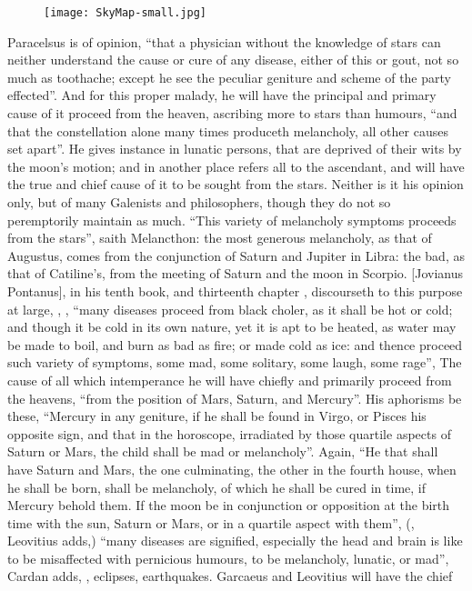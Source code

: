 \begin{figure}[p]
  \begingroup
  \centering
  \texttt{[image: SkyMap-small.jpg]}
  \label{fig:skymap}
\end{figure}

Paracelsus is of opinion, \enquote{that a physician without the
knowledge of stars can neither understand the cause or cure of any disease,
either of this or gout, not so much as toothache; except he see the peculiar
geniture and scheme of the party effected}. And for this proper malady, he will
have the principal and primary cause of it proceed from the heaven, ascribing
more to stars than humours, \enquote{and that the constellation
alone many times produceth melancholy, all other causes set apart}. He gives
instance in lunatic persons, that are deprived of their wits by the moon's
motion; and in another place refers all to the ascendant, and will have the
true and chief cause of it to be sought from the stars. Neither is it his
opinion only, but of many Galenists and philosophers, though they do not so
peremptorily maintain as much. \enquote{This variety of melancholy symptoms proceeds
from the stars}, saith Melancthon: the most generous
melancholy, as that of Augustus, comes from the conjunction of Saturn and
Jupiter in Libra: the bad, as that of Catiline's, from the meeting of Saturn
and the moon in Scorpio. [Jovianus Pontanus], in his tenth book, and thirteenth
chapter , discourseth to this purpose at large, , \etc{}, \enquote{many diseases
proceed from black choler, as it shall be hot or cold; and though it be cold in
its own nature, yet it is apt to be heated, as water may be made to boil, and
burn as bad as fire; or made cold as ice: and thence proceed such variety of
symptoms, some mad, some solitary, some laugh, some rage}, \etc{} The cause of
all which intemperance he will have chiefly and primarily proceed from the
heavens, \enquote{from the position of Mars, Saturn, and Mercury}.
His aphorisms be these, \enquote{Mercury in any geniture, if he
shall be found in Virgo, or Pisces his opposite sign, and that in the
horoscope, irradiated by those quartile aspects of Saturn or Mars, the child
shall be mad or melancholy}. Again, \enquote{He that shall have
Saturn and Mars, the one culminating, the other in the fourth house, when he
shall be born, shall be melancholy, of which he shall be cured in time, if
Mercury behold them. If the moon be in conjunction or
opposition at the birth time with the sun, Saturn or Mars, or in a quartile
aspect with them}, (, Leovitius adds,) \enquote{many diseases are
signified, especially the head and brain is like to be misaffected with
pernicious humours, to be melancholy, lunatic, or mad}, Cardan adds, , eclipses, earthquakes. Garcaeus and Leovitius will have the chief
